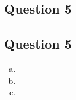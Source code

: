 \documentclass{article}
\begin{document}

\subsection*{Question 5}



\subsection*{Question 5}

\begin{enumerate}[(a)]
	\item 
	
	
	\item 
	
	
	\item 
	
	
\end{enumerate}


\end{document}
